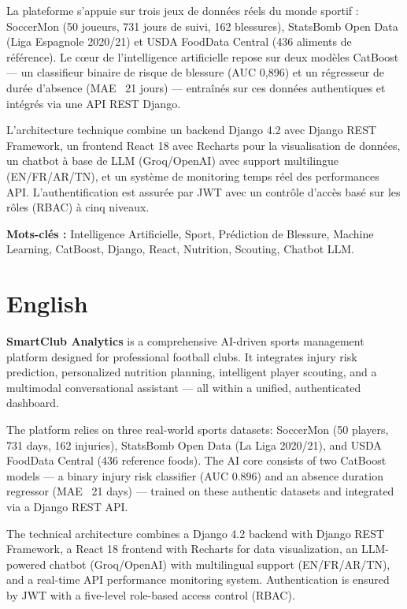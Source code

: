 \documentclass{modificopy}
\begin{document}
La plateforme s'appuie sur trois jeux de données réels du monde sportif : SoccerMon (50 joueurs, 731 jours de suivi, 162 blessures), StatsBomb Open Data (Liga Espagnole 2020/21) et USDA FoodData Central (436 aliments de référence). Le cœur de l'intelligence artificielle repose sur deux modèles CatBoost — un classifieur binaire de risque de blessure (AUC 0,896) et un régresseur de durée d'absence (MAE ~21 jours) — entraînés sur ces données authentiques et intégrés via une API REST Django.

L'architecture technique combine un backend Django 4.2 avec Django REST Framework, un frontend React 18 avec Recharts pour la visualisation de données, un chatbot à base de LLM (Groq/OpenAI) avec support multilingue (EN/FR/AR/TN), et un système de monitoring temps réel des performances API. L'authentification est assurée par JWT avec un contrôle d'accès basé sur les rôles (RBAC) à cinq niveaux.

\vspace{0.5cm}
\textbf{Mots-clés :} Intelligence Artificielle, Sport, Prédiction de Blessure, Machine Learning, CatBoost, Django, React, Nutrition, Scouting, Chatbot LLM.

\section*{English}

\textbf{SmartClub Analytics} is a comprehensive AI-driven sports management platform designed for professional football clubs. It integrates injury risk prediction, personalized nutrition planning, intelligent player scouting, and a multimodal conversational assistant — all within a unified, authenticated dashboard.

The platform relies on three real-world sports datasets: SoccerMon (50 players, 731 days, 162 injuries), StatsBomb Open Data (La Liga 2020/21), and USDA FoodData Central (436 reference foods). The AI core consists of two CatBoost models — a binary injury risk classifier (AUC 0.896) and an absence duration regressor (MAE ~21 days) — trained on these authentic datasets and integrated via a Django REST API.

The technical architecture combines a Django 4.2 backend with Django REST Framework, a React 18 frontend with Recharts for data visualization, an LLM-powered chatbot (Groq/OpenAI) with multilingual support (EN/FR/AR/TN), and a real-time API performance monitoring system. Authentication is ensured by JWT with a five-level role-based access control (RBAC).
\end{document}
